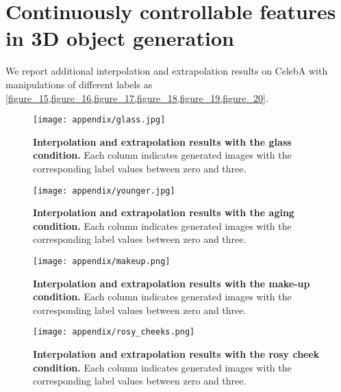 \documentclass[nohyperref]{article}
\theoremstyle{plain}
\theoremstyle{definition}
\theoremstyle{remark}
\begin{document}
\section{Continuously controllable features in 3D object generation}
We report additional interpolation and extrapolation results on CelebA with manipulations of different labels as \cref{figure_15,figure_16,figure_17,figure_18,figure_19,figure_20}.

\begin{figure}[h]
\begin{center}
\centerline{\texttt{[image: appendix/glass.jpg]}}
\caption{\textbf{Interpolation and extrapolation results with the glass condition.} Each column indicates generated images with the corresponding label values between zero and three.}
\label{figure_15}
\end{center}
\vskip -0.2in
\end{figure}


\begin{figure}[h]
\begin{center}
\centerline{\texttt{[image: appendix/younger.jpg]}}
\caption{\textbf{Interpolation and extrapolation results with the aging condition.} Each column indicates generated images with the corresponding label values between zero and three.}
\label{figure_16}
\end{center}
\vskip -0.2in
\end{figure}


\begin{figure}[h]
\begin{center}
\centerline{\texttt{[image: appendix/makeup.png]}}
\caption{\textbf{Interpolation and extrapolation results with the make-up condition.} Each column indicates generated images with the corresponding label values between zero and three.}
\label{figure_17}
\end{center}
\vskip -0.2in
\end{figure}


\begin{figure}[h]
\begin{center}
\centerline{\texttt{[image: appendix/rosy\_cheeks.png]}}
\caption{\textbf{Interpolation and extrapolation results with the rosy cheek condition.} Each column indicates generated images with the corresponding label values between zero and three.}
\label{figure_18}
\end{center}
\vskip -0.2in
\end{figure}
\end{document}
